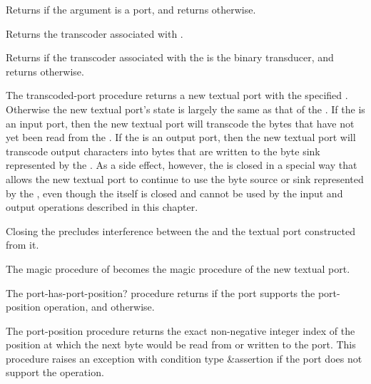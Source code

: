 \begin{entry}{%
}
   
Returns \schtrue{} if the argument is a port, and returns \schfalse{}
otherwise.
\end{entry}

\begin{entry}{%
}

Returns the transcoder associated with .
\end{entry}

\begin{entry}{%
}

Returns \schtrue{} if the transcoder associated with the 
is the binary transducer, and returns \schfalse{} otherwise.
\end{entry}

\begin{entry}{%
}

The {\cf transcoded-port} procedure
returns a new textual port with the specified .
Otherwise the new textual port's state is largely the same as
that of the .
If the  is an input port, then the new textual
port will transcode the bytes that have not yet been read from
the .
If the  is an output port, then the new textual
port will transcode output characters into bytes that are
written to the byte sink represented by the .
As a side effect, however, the  is closed in
a special way that allows the new textual port to continue to
use the byte source or sink represented by the ,
even though the  itself is closed and cannot
be used by the input and output operations described in this
chapter.

\begin{rationale}
Closing the  precludes interference between
the  and the textual port constructed from it.
\end{rationale}

The magic procedure of  becomes the magic
procedure of the new textual port.
\end{entry}

\begin{entry}{%
}

The {\cf port-has-port-position?} procedure returns \schtrue{} if the
port supports the {\cf port-position} operation, and \schfalse{}
otherwise.

The {\cf port-position} procedure
returns the exact non-negative integer index of the position at which the
next byte would be read from or written to the port.
This procedure raises an exception with condition type {\cf\&assertion}
if the port does not support the operation.
\end{entry}   

